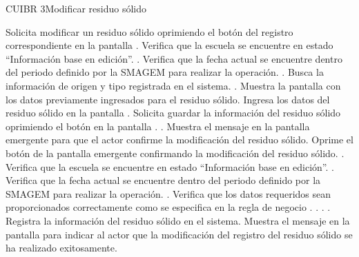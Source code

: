 \begin{UseCase}{CUIBR 3}{Modificar residuo sólido}

\end{UseCase}

 \begin{UCtrayectoria}
    \UCpaso[\UCactor] Solicita modificar un residuo sólido oprimiendo el botón \botEdit del registro correspondiente en la pantalla .
    \UCpaso[\UCsist] Verifica que la escuela se encuentre en estado ``Información base en edición''. .
    \UCpaso[\UCsist] Verifica que la fecha actual se encuentre dentro del periodo definido por la SMAGEM para realizar la operación. .
    \UCpaso[\UCsist] Busca la información de origen y tipo registrada en el sistema. .
    \UCpaso[\UCsist] Muestra la pantalla  con los datos previamente ingresados para el residuo sólido.
    \UCpaso[\UCactor] Ingresa los datos del residuo sólido en la pantalla . \label{cuibr3:Modificar}
    \UCpaso[\UCactor] Solicita guardar la información del residuo sólido oprimiendo el botón  en la pantalla . .
    \UCpaso[\UCsist] Muestra el mensaje  en la pantalla emergente  para que el actor confirme la modificación del residuo sólido.
     \UCpaso[\UCactor] Oprime el botón  de la pantalla emergente  confirmando la modificación del residuo sólido. .
     \UCpaso[\UCsist] Verifica que la escuela se encuentre en estado ``Información base en edición''. .
    \UCpaso[\UCsist] Verifica que la fecha actual se encuentre dentro del periodo definido por la SMAGEM para realizar la operación. .
    \UCpaso[\UCsist] Verifica que los datos requeridos sean proporcionados correctamente como se especifica en la regla de negocio . . . .    
    \UCpaso[\UCsist] Registra la información del residuo sólido en el sistema.
    \UCpaso[\UCsist] Muestra el mensaje  en la pantalla  para indicar al actor que la modificación del registro del residuo sólido se ha realizado exitosamente. 
    
 \end{UCtrayectoria}
 
